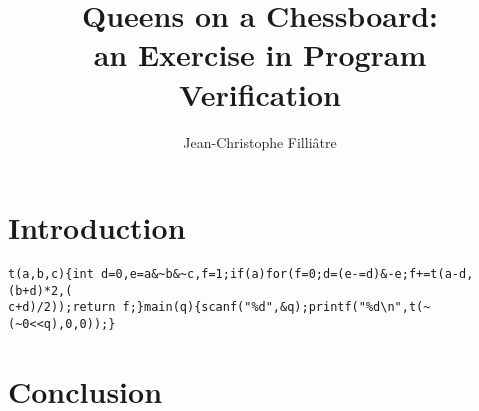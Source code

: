 \documentclass[a4paper,12pt]{article}
\begin{document}
\title{Queens on a Chessboard: \\
       an Exercise in Program Verification}
\author{Jean-Christophe Filli\^atre}
\maketitle
\begin{abstract}
  
\end{abstract}

\section{Introduction}

\begin{verbatim}
t(a,b,c){int d=0,e=a&~b&~c,f=1;if(a)for(f=0;d=(e-=d)&-e;f+=t(a-d,(b+d)*2,(
c+d)/2));return f;}main(q){scanf("%d",&q);printf("%d\n",t(~(~0<<q),0,0));}
\end{verbatim}

\section{Conclusion}



\end{document}
